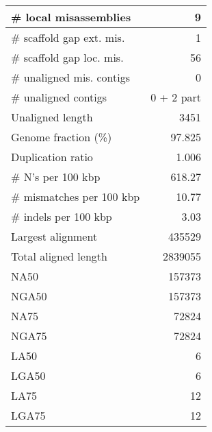 \documentclass[12pt,a4paper]{article}
\begin{document}
\begin{table}[ht]
\begin{center}
\begin{tabular}{|l*{1}{|r}|}
\# local misassemblies & 9 \\ \hline
\# scaffold gap ext. mis. & 1 \\ \hline
\# scaffold gap loc. mis. & 56 \\ \hline
\# unaligned mis. contigs & 0 \\ \hline
\# unaligned contigs & 0 + 2 part \\ \hline
Unaligned length & 3451 \\ \hline
Genome fraction (\%) & 97.825 \\ \hline
Duplication ratio & 1.006 \\ \hline
\# N's per 100 kbp & 618.27 \\ \hline
\# mismatches per 100 kbp & 10.77 \\ \hline
\# indels per 100 kbp & 3.03 \\ \hline
Largest alignment & 435529 \\ \hline
Total aligned length & 2839055 \\ \hline
NA50 & 157373 \\ \hline
NGA50 & 157373 \\ \hline
NA75 & 72824 \\ \hline
NGA75 & 72824 \\ \hline
LA50 & 6 \\ \hline
LGA50 & 6 \\ \hline
LA75 & 12 \\ \hline
LGA75 & 12 \\ \hline
\end{tabular}
\end{center}
\end{table}
\end{document}
